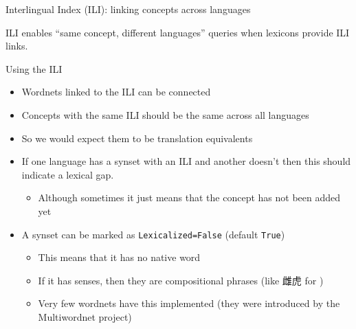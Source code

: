 \documentclass[aspectratio=169]{beamer}
\newcommand{\avmtype}{\scriptsize\itshape\color{black!70}\raggedright}
\newcommand{\avmcontent}{\small}
\newcommand{\avmnode}[4][]{%
  \node[#2, #1] (#3) {%
    {\avmtype #2}\\
    {\avmcontent \shortstack{#4}}%
  };
}
\begin{document}
\begin{frame}{Interlingual Index (ILI): linking concepts across languages}
\centering
{}

\smallskip
\small
ILI enables “same concept, different languages” queries when lexicons provide ILI links.
\end{frame}


\begin{frame}{Using the ILI} 

  \begin{itemize}
  \item Wordnets linked to the ILI can be connected
  \item Concepts with the same ILI should be the same across all languages
  \item So we would expect them to be translation equivalents
  \item If one language has a synset with an ILI and another doesn't then this should indicate a lexical gap.
    \begin{itemize}
    \item Although sometimes it just means that the concept has not been added yet
    \end{itemize}
  \item A synset can be marked as \texttt{Lexicalized=False}  (default \texttt{True})
    \begin{itemize}
    \item This means that it has no native word
    \item If it has senses, then they are compositional phrases (like 雌虎  for )
    \item Very few wordnets have this implemented (they were introduced by the Multiwordnet project)
    \end{itemize}
  \end{itemize}
  
\end{frame}
\end{document}
